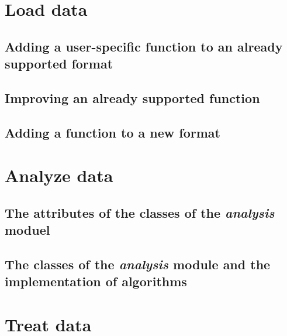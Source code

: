 \documentclass{book}
\begin{document}
    
    \chapter{Load data} \label{chapter:load_data}
        
        \section{Adding a user-specific function to an already supported format} \label{section:load_data.user_specific}
            

        \section{Improving an already supported function} \label{section:load_data.improvement}
            

        \section{Adding a function to a new format} \label{section:load_data.new_format}
            
            
    \chapter{Analyze data} \label{chapter:analysis}
        
        \section{The attributes of the classes of the \textit{analysis} moduel} \label{sec:analysis.attributes}
            

        \section{The classes of the \textit{analysis} module and the implementation of algorithms} \label{sec:analysis.inheritance}
            


    \chapter{Treat data} \label{chapter:treatment}
        
\end{document}
